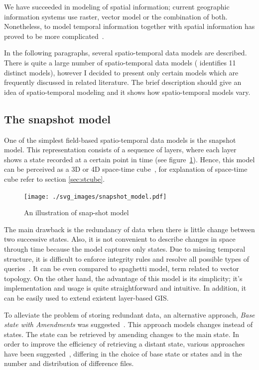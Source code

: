\documentclass[a4paper,12pt,oneside]{book}
\begin{document}
We have succeeded in modeling of spatial information;
current geographic information systems use raster, vector model or the combination of both.
Nonetheless, to model temporal information together with spatial information
has proved to be more complicated~\cite{peuquet2001}.

In the following paragraphs, several spatio-temporal data models are described.
There is quite a large number of spatio-temporal data models (\cite{pelekis2004} identifies 11 distinct models), however
I decided to present only certain models which are frequently discussed in related literature.
The brief description should give an idea of spatio-temporal modeling
and it shows how spatio-temporal models vary.

\subsection{The snapshot model}
One of the simplest field-based spatio-temporal data models is the snapshot model.
This representation consists of a sequence of layers,
where each layer shows a state recorded at a certain point in time (see figure~\ref{fig:snapshot_model}).
Hence, this model can be perceived as a 3D or 4D space-time cube~\cite{peuquet2001}, for explanation of space-time cube refer to section \ref{sec:stcube}.

\begin{figure}[h!]
  \centering
  \texttt{[image: ./svg\_images/snapshot\_model.pdf]}
  \caption{An illustration of snap-shot model}
  \label{fig:snapshot_model}
\end{figure}


The main drawback is the redundancy of data when there is little change between two successive states.
Also, it is not convenient to describe changes in space through time because the model captures only states.
Due to missing temporal structure, it is difficult to enforce integrity rules
and resolve all possible types of queries~\cite{pelekis2004}.
It can be even compared to spaghetti model, term related to vector topology.
On the other hand, the advantage of this model is its simplicity;
it's implementation and usage is quite straightforward and intuitive.
In addition, it can be easily used to extend existent layer-based GIS.

To alleviate the problem of storing redundant data, an alternative approach,
\emph{Base state with Amendments} was suggested~\cite{langran1988}.
This approach models changes instead of states.
The state can be retrieved by amending changes to the main state.
In order to improve the efficiency of retrieving a distant state,
various approaches have been suggested~\cite{wang2012},
differing in the choice of base state or states and in the number and distribution of difference files.
\end{document}
